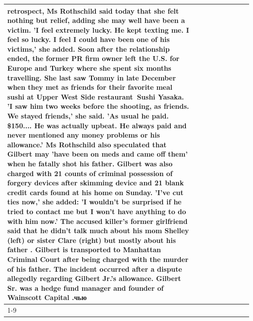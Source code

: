 \begin{table}[H]
\begin{tabular}{lllrlllll}
retrospect, Ms Rothschild said today that she felt nothing but relief, adding she may well have been a victim. 'I feel extremely lucky. He kept texting me. I feel so lucky. I feel I could have been one of his victims,' she added. Soon after the relationship ended, the former PR firm owner left the U.S. for Europe and Turkey where she spent six months  travelling. She last saw Tommy in late December when they met as friends for their favorite meal sushi at Upper West Side restaurant Sushi Yasaka. 'I saw him two weeks before the shooting, as friends. We stayed friends,' she said. 'As usual he paid. \$150.... He was actually upbeat. He always paid and never mentioned any money problems or his allowance.' Ms Rothschild also speculated that Gilbert may 'have been on meds and came off them' when he fatally shot his father. Gilbert was also charged with 21 counts of criminal possession of forgery devices after skimming device and 21 blank credit cards found at his home on Sunday. 'I've cut ties now,' she added: 'I wouldn’t be surprised if he tried to contact me but I won’t have anything to do with him now.' The accused killer's former girlfriend said that he didn't talk much about his mom Shelley (left) or sister Clare (right) but mostly about his father . Gilbert is transported to Manhattan Criminal Court  after being charged with the murder of his father. The incident occurred after a dispute allegedly regarding Gilbert Jr.'s allowance. Gilbert Sr. was a hedge fund manager and founder of Wainscott Capital .чью \\
\cline{1-9}

\end{tabular}
\end{table}
